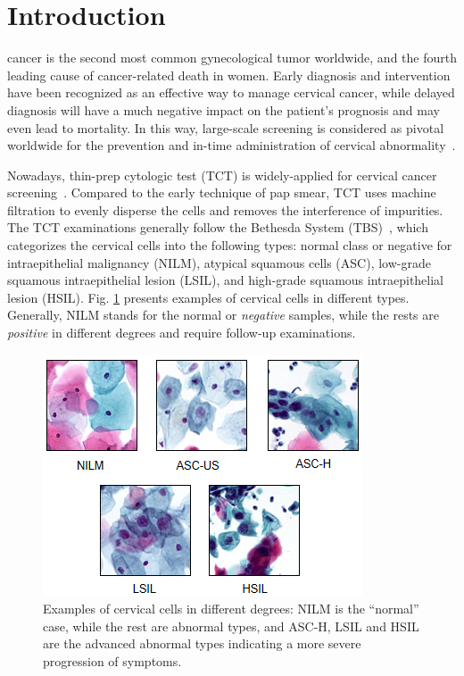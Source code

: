 \section{Introduction}
\label{sec:introduction}

 cancer is the second most common gynecological tumor worldwide, and the fourth leading cause of cancer-related death in women. Early diagnosis and intervention have been recognized as an effective way to manage cervical cancer, while delayed diagnosis will have a much negative impact on the patient's prognosis and may even lead to mortality. In this way, large-scale screening is considered as pivotal worldwide for the prevention and in-time administration of cervical abnormality~\cite{schiffman2007human}.



Nowadays, thin-prep cytologic test (TCT) is widely-applied for cervical cancer screening~\cite{koss1989papanicolaou}. 
Compared to the early technique of pap smear, TCT uses machine filtration to evenly disperse the cells and removes the interference of impurities. The TCT examinations generally follow the Bethesda System (TBS)~\cite{nayar2015bethesda}, which categorizes the cervical cells into the following types: normal class or negative for intraepithelial malignancy (NILM), atypical squamous cells (ASC), low-grade squamous intraepithelial lesion (LSIL), and high-grade squamous intraepithelial lesion (HSIL). 
Fig. \ref{fig:tbs} presents examples of cervical cells in different types. 
Generally, NILM stands for the normal or \textit{negative} samples, while the rests are \textit{positive} in different degrees and require follow-up examinations. 



\begin{figure}
    \centering
    \includegraphics[scale=0.8]{figures/tbs.png}
    \caption{Examples of cervical cells in different degrees: NILM is the ``normal'' case, while the rest are abnormal types, and ASC-H, LSIL and HSIL are the advanced abnormal types indicating a more severe progression of symptoms.}
    \label{fig:tbs}
\end{figure}


